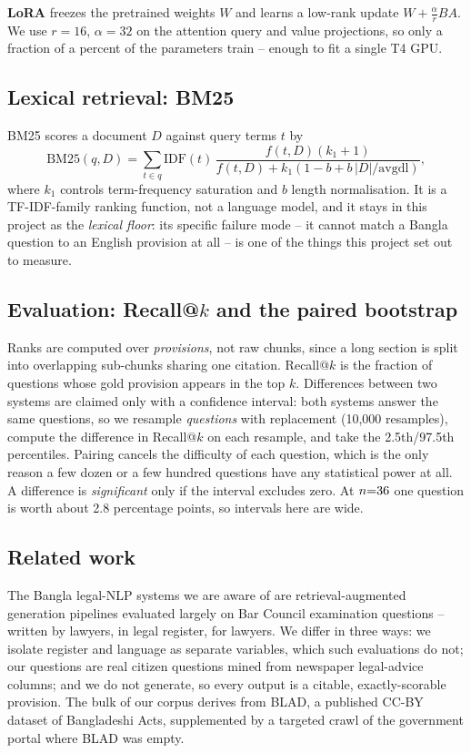 \documentclass[10pt,a4paper]{article}
\begin{document}
\textbf{LoRA} freezes the pretrained weights $W$ and learns a low-rank update $W+\tfrac{\alpha}{r}BA$. We use $r{=}16$, $\alpha{=}32$ on the attention query and value projections, so only a fraction of a percent of the parameters train -- enough to fit a single T4 GPU.

\subsection{Lexical retrieval: BM25}
BM25 scores a document $D$ against query terms $t$ by
\begin{equation}
\mathrm{BM25}(q,D)=\sum_{t\in q}\mathrm{IDF}(t)\,\frac{f(t,D)(k_1+1)}{f(t,D)+k_1(1-b+b\,|D|/\mathrm{avgdl})},
\end{equation}
where $k_1$ controls term-frequency saturation and $b$ length normalisation. It is a TF-IDF-family ranking function, not a language model, and it stays in this project as the \emph{lexical floor}: its specific failure mode -- it cannot match a Bangla question to an English provision at all -- is one of the things this project set out to measure.

\subsection{Evaluation: Recall@$k$ and the paired bootstrap}
\label{sec:bootstrapmethod}
Ranks are computed over \emph{provisions}, not raw chunks, since a long section is split into overlapping sub-chunks sharing one citation. Recall@$k$ is the fraction of questions whose gold provision appears in the top $k$. Differences between two systems are claimed only with a confidence interval: both systems answer the same questions, so we resample \emph{questions} with replacement (10{,}000 resamples), compute the difference in Recall@$k$ on each resample, and take the 2.5th/97.5th percentiles. Pairing cancels the difficulty of each question, which is the only reason a few dozen or a few hundred questions have any statistical power at all. A difference is \emph{significant} only if the interval excludes zero. At $n{=}36$ one question is worth about 2.8 percentage points, so intervals here are wide.

\subsection{Related work}
The Bangla legal-NLP systems we are aware of are retrieval-augmented generation pipelines evaluated largely on Bar Council examination questions -- written by lawyers, in legal register, for lawyers. We differ in three ways: we isolate register and language as separate variables, which such evaluations do not; our questions are real citizen questions mined from newspaper legal-advice columns; and we do not generate, so every output is a citable, exactly-scorable provision. The bulk of our corpus derives from BLAD, a published CC-BY dataset of Bangladeshi Acts, supplemented by a targeted crawl of the government portal where BLAD was empty.
\end{document}
